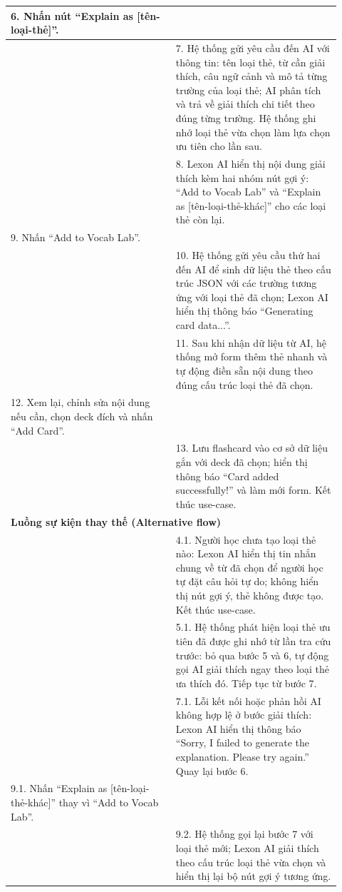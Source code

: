 \begin{longtable}{|p{0.46\linewidth}|p{0.46\linewidth}|}
    6. Nhấn nút ``Explain as [tên-loại-thẻ]''. & \\ \hline
    & 7. Hệ thống gửi yêu cầu đến AI với thông tin: tên loại thẻ, từ cần giải thích, câu ngữ cảnh và mô tả từng trường của loại thẻ; AI phân tích và trả về giải thích chi tiết theo đúng từng trường. Hệ thống ghi nhớ loại thẻ vừa chọn làm lựa chọn ưu tiên cho lần sau. \\ \hline
    & 8. Lexon AI hiển thị nội dung giải thích kèm hai nhóm nút gợi ý: ``Add to Vocab Lab'' và ``Explain as [tên-loại-thẻ-khác]'' cho các loại thẻ còn lại. \\ \hline
    9. Nhấn ``Add to Vocab Lab''. & \\ \hline
    & 10. Hệ thống gửi yêu cầu thứ hai đến AI để sinh dữ liệu thẻ theo cấu trúc JSON với các trường tương ứng với loại thẻ đã chọn; Lexon AI hiển thị thông báo ``Generating card data...''. \\ \hline
    & 11. Sau khi nhận dữ liệu từ AI, hệ thống mở form thêm thẻ nhanh và tự động điền sẵn nội dung theo đúng cấu trúc loại thẻ đã chọn. \\ \hline
    12. Xem lại, chỉnh sửa nội dung nếu cần, chọn deck đích và nhấn ``Add Card''. & \\ \hline
    & 13. Lưu flashcard vào cơ sở dữ liệu gắn với deck đã chọn; hiển thị thông báo ``Card added successfully!'' và làm mới form. Kết thúc use-case. \\ \hline
    \multicolumn{2}{|l|}{\textbf{Luồng sự kiện thay thế (Alternative flow)}} \\ \hline
    & 4.1. Người học chưa tạo loại thẻ nào: Lexon AI hiển thị tin nhắn chung về từ đã chọn để người học tự đặt câu hỏi tự do; không hiển thị nút gợi ý, thẻ không được tạo. Kết thúc use-case. \\ \hline
    & 5.1. Hệ thống phát hiện loại thẻ ưu tiên đã được ghi nhớ từ lần tra cứu trước: bỏ qua bước 5 và 6, tự động gọi AI giải thích ngay theo loại thẻ ưa thích đó. Tiếp tục từ bước 7. \\ \hline
    & 7.1. Lỗi kết nối hoặc phản hồi AI không hợp lệ ở bước giải thích: Lexon AI hiển thị thông báo ``Sorry, I failed to generate the explanation. Please try again.'' Quay lại bước 6. \\ \hline
    9.1. Nhấn ``Explain as [tên-loại-thẻ-khác]'' thay vì ``Add to Vocab Lab''. & \\ \hline
    & 9.2. Hệ thống gọi lại bước 7 với loại thẻ mới; Lexon AI giải thích theo cấu trúc loại thẻ vừa chọn và hiển thị lại bộ nút gợi ý tương ứng. \\ \hline

\end{longtable}
